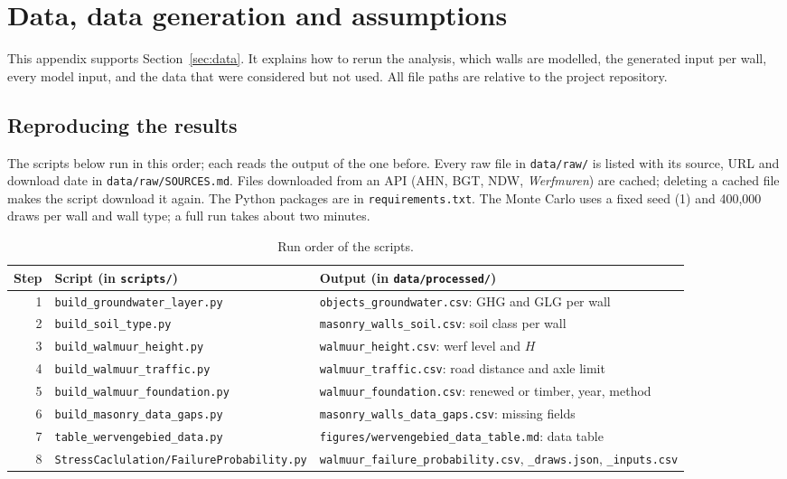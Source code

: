 
\section{Data, data generation and assumptions}\label{app:data}

This appendix supports Section~\ref{sec:data}. It explains how to rerun the
analysis, which walls are modelled, the generated input per wall, every model
input, and the data that were considered but not used. All file paths are
relative to the project repository.

\subsection{Reproducing the results}\label{app:data-run}

The scripts below run in this order; each reads the output of the one before.
Every raw file in \texttt{data/raw/} is listed with its source, URL and
download date in \texttt{data/raw/SOURCES.md}. Files downloaded from an API
(AHN, BGT, NDW, \emph{Werfmuren}) are cached; deleting a cached file makes the
script download it again. The Python packages are in
\texttt{requirements.txt}. The Monte Carlo uses a fixed seed (1) and
400{,}000 draws per wall and wall type; a full run takes about two minutes.

\begin{table}[htbp]
\centering
\small
\caption{Run order of the scripts.}
\label{tab:run-order}
\begin{tabularx}{\textwidth}{@{}r l >{\raggedright\arraybackslash}X@{}}
\toprule
Step & Script (in \texttt{scripts/}) & Output (in \texttt{data/processed/}) \\
\midrule
1 & \texttt{build\_groundwater\_layer.py} & \texttt{objects\_groundwater.csv}: GHG and GLG per wall \\
2 & \texttt{build\_soil\_type.py} & \texttt{masonry\_walls\_soil.csv}: soil class per wall \\
3 & \texttt{build\_walmuur\_height.py} & \texttt{walmuur\_height.csv}: werf level and $H$ \\
4 & \texttt{build\_walmuur\_traffic.py} & \texttt{walmuur\_traffic.csv}: road distance and axle limit \\
5 & \texttt{build\_walmuur\_foundation.py} & \texttt{walmuur\_foundation.csv}: renewed or timber, year, method \\
6 & \texttt{build\_masonry\_data\_gaps.py} & \texttt{masonry\_walls\_data\_gaps.csv}: missing fields \\
7 & \texttt{table\_wervengebied\_data.py} & \texttt{figures/wervengebied\_data\_table.md}: data table \\
8 & \texttt{StressCaclulation/FailureProbability.py} & \texttt{walmuur\_failure\_probability.csv}, \texttt{\_draws.json}, \texttt{\_inputs.csv} \\
\bottomrule
\end{tabularx}
\end{table}

